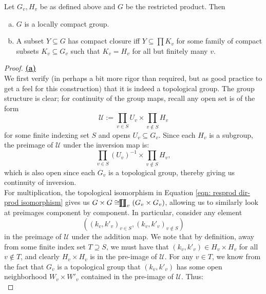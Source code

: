 \documentclass[11pt, x11names, openany]{book}
\newcommand{\calu}{\mathcal{U}}
\renewcommand{\brack}[1]{\left(   #1 \right)}
\newcommand{\rprod}{
    \mathrel{\ooalign{\hidewidth $\prod$ \hidewidth \cr $\coprod$}}
}
\newcommand{\inv}[1]{#1^{-1}}
\begin{document}
\begin{prop}
\label{restricted product properties}
Let $G_v, H_v$ be as defined above and $G$ be the restricted product. Then
\begin{enumerate}[(a)]
    \item $G$ is a locally compact group.
    \item A subset $Y \subseteq G$ has compact closure iff $Y \subseteq \prod K_v$ for some family of compact subsets $K_v \subseteq G_v$ such that $K_v = H_v$ for all but finitely many $v$.
\end{enumerate}
\end{prop}
\begin{proof}
\textbf{\underline{(a)}}\\
We first verify (in perhaps a bit more rigor than required, but as good practice to get a feel for this construction) that it is indeed a topological group. The group structure is clear; for continuity of the group maps, recall any open set is of the form
\begin{equation*}
    \calu := \prod_{v \in S} U_v \times \prod_{v \notin S} H_v
\end{equation*}
for some finite indexing set $S$ and opens $U_v \subseteq G_v$. Since each $H_v$ is a subgroup, the preimage of $\calu$ under the inversion map is:
\begin{equation*}
    \prod_{v \in S} \inv{\brack{U_v}} \times \prod_{v \notin S} H_v,
\end{equation*}
which is also open since each $G_v$ is a topological group, thereby giving us continuity of inversion.\\
For multiplication, the topological isomorphism in Equation \ref{eqn: resprod dir-prod isomorphism} gives us $G \times G \cong \rprod_v (G_v \times G_v)$, allowing us to similarly look at preimages component by component. In particular, consider any element
\begin{equation*}
    \brack{ \brack{k_v, k'_v}_{v \in S}, \brack{k_v, k'_v}_{v \notin S}}
\end{equation*}
in the preimage of $\calu$ under the addition map. We note that by definition, away from some finite index set $T \supseteq S$, we must have that $(k_v, k'_v) \in H_v \times H_v$ for all $v \notin T$, and clearly $H_v \times H_v$ is in the pre-image of $\calu$. For any $v \in T$, we know from the fact that $G_v$ is a topological group that $(k_v, k'_v)$ has some open neighborhood $W_v \times W'_v$ contained in the pre-image of $\calu$. Thus:
\begin{equation*}

\end{equation*}
\end{proof}
\end{document}
